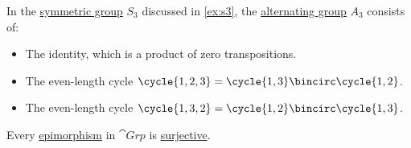 \begin{example}\label{ex:s3_and_a3}
  In the \hyperref[def:symmetric_group]{symmetric group} \( S_3 \) discussed in \cref{ex:s3}, the \hyperref[def:alternating_group]{alternating group} \( A_3 \) consists of:
  \begin{itemize}
    \item The identity, which is a product of zero transpositions.
    \item The even-length cycle \( \cycle{ 1, 2, 3 } = \cycle{ 1, 3 } \bincirc \cycle{ 1, 2 } \).
    \item The even-length cycle \( \cycle{ 1, 3, 2 } = \cycle{ 1, 2 } \bincirc \cycle{ 1, 3 } \).
  \end{itemize}
\end{example}

\begin{proposition}\label{thm:group_epimorphisms_are_surjective}
  Every \hyperref[def:fol_epimorphism]{epimorphism} in \hyperref[def:group/category]{\( \cat{Grp} \)} is \hyperref[def:function_invertibility/surjective]{surjective}.
\end{proposition}
